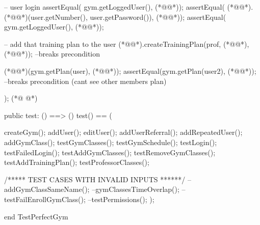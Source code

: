 \begin{vdmpp}[breaklines=true]
  -- user login
  assertEqual( gym.getLoggedUser(), (*@@*)); 
   assertEqual( (*@@*).(*@@*)(user.getNumber(), user.getPassword()), (*@@*));
   assertEqual( gym.getLoggedUser(), (*@@*));
  
  -- add that training plan to the user
  (*@@*).createTrainingPlan(prof, (*@@*), (*@@*)); --breaks precondition
  
   (*@@*)(gym.getPlan(user), (*@@*));
   assertEqual(gym.getPlan(user2), (*@@*)); --breaks precondition (cant see other members plan)
  
 );
(*@
\label{test:462}
@*)
  
 public test: () ==> ()
 test() == (
    
    createGym();
   addUser();
   editUser();
   addUserReferral();
   addRepeatedUser();
   addGymClass();
   testGymClasses();
   testGymSchedule(); 
   testLogin();
   testFailedLogin();
   testAddGymClasses();
   testRemoveGymClasses();
    testAddTrainingPlan();
    testProfessorClasses();
   
   /***** TEST CASES WITH INVALID INPUTS ******/
   --addGymClassSameName();
   --gymClassesTimeOverlap();
   --testFailEnrollGymClass();
   --testPermissions();
 );

 
end TestPerfectGym
\end{vdmpp}
\bigskip
